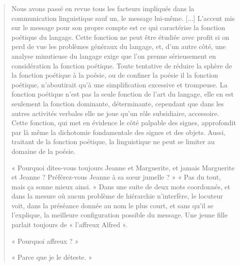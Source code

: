 \begin{quote}\small
Nous avons passé en revue tous les facteurs impliqués dans la communication linguistique sauf un, le message lui-même. [...] L’accent mis sur le message pour son propre compte est ce qui caractérise la fonction poétique du langage. Cette fonction ne peut être étudiée avec profit si on perd de vue les problèmes généraux du langage, et, d’un autre côté, une analyse minutieuse du langage exige que l’on prenne sérieusement en considération la fonction poétique. Toute tentative de réduire la sphère de la fonction poétique à la poésie, ou de confiner la poésie il la fonction poétique, n’aboutirait qu’à une simplification excessive et trompeuse. La fonction poétique n’est pas la seule fonction de l’art du langage, elle en est seulement la fonction dominante, déterminante, cependant que dans les autres activités verbales elle ne joue qu’un rôle subsidiaire, accessoire. Cette fonction, qui met en évidence le côté palpable des signes, approfondit par là même la dichotomie fondamentale des signes et des objets. Aussi, traitant de la fonction poétique, la linguistique ne peut se limiter au domaine de la poésie.

« Pourquoi dites-vous toujours Jeanne et Marguerite, et jamais Marguerite et Jeanne ? Préférez-vous Jeanne à sa sœur jumelle ? » « Pas du tout, mais ça sonne mieux ainsi. » Dans une suite de deux mots coordonnés, et dans la mesure où aucun problème de hiérarchie n’interfère, le locuteur voit, dans la préséance donnée au nom le plus court, et sans qu’il se l’explique, la meilleure configuration possible du message. Une jeune fille parlait toujours de « l’affreux Alfred ».

« Pourquoi affreux ? »

« Parce que je le déteste. »


\end{quote}
